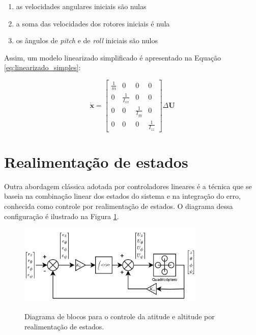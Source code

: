\documentclass[main.tex]{subfiles}
\begin{document}
\begin{enumerate}
    \item as velocidades angulares iniciais são nulas
    \item a soma das velocidades dos rotores iniciais é nula
    \item os ângulos de \textit{pitch} e de \textit{roll} iniciais são nulos
\end{enumerate}

Assim, um modelo linearizado simplificado é apresentado na Equação \ref{eq:linearizado_simples}:

\begin{equation}\label{eq:linearizado_simples}
    \boldsymbol{\dot{x}} = 
    \begin{bmatrix}
        \frac{1}{m}&0&0&0\\ 
        0&\frac{1}{I_{xx}}&0&0\\
        0&0&\frac{1}{I_{yy}}&0\\
        0&0&0&\frac{1}{I_{zz}}
    \end{bmatrix}
    \Delta\boldsymbol{U}
\end{equation}

\section{Realimentação de estados}

Outra abordagem clássica adotada por controladores lineares é a técnica que se baseia na combinação linear dos estados do sistema e na integração do erro, conhecida como controle por realimentação de estados. O diagrama dessa configuração é ilustrado na Figura \ref{fig:realimentacao_estados}.

\begin{figure}[!h]
    \centering
    \caption{Diagrama de blocos para o controle da atitude e altitude por realimentação de estados.}
    \includegraphics[width=0.8\textwidth]{capitulos/controle_atitude/imgs/controle_realimentacao_estados.png}
    \label{fig:realimentacao_estados}
\end{figure}
\end{document}
